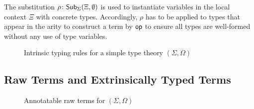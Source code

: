 \documentclass[acmsmall,screen]{acmart}
\theoremstyle{acmdefinition}
\begin{document}
The substitution $\rho\colon \mathsf{Sub}_{\Sigma}(\Xi,\emptyset)$ is used to instantiate variables in the local context $\Xi$ with concrete types.
Accordingly, $\rho$ has to be applied to types that appear in the arity to construct a term by $\mathsf{op}$ to ensure all types are well-formed without any use of type variables.

\begin{figure}
  \centering
  \small
  \caption{Intrinsic typing rules for a simple type theory $(\Sigma, \Omega)$}
  \label{fig:intrinsic-typing}
\end{figure}

\subsection{Raw Terms and Extrinsically Typed Terms}

\begin{figure}
  \centering
  \small
  \caption{Annotatable raw terms for $(\Sigma, \Omega)$}
\end{figure}
\end{document}
